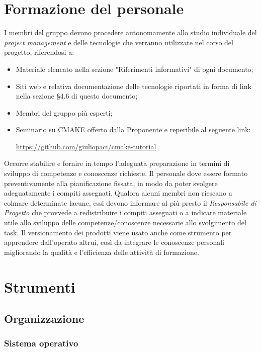 \documentclass[../NormediProgetto.tex]{subfiles}
\begin{document}
	\section{Formazione del personale}
	I membri del gruppo devono procedere autonomamente allo studio individuale del \textit{project management} e delle tecnologie che verranno utilizzate nel corso del progetto, riferendosi a:
	\begin{itemize}
		\item Materiale elencato nella sezione "Riferimenti informativi" di ogni documento;
		\item Siti web e relativa documentazione delle tecnologie riportati in forma di link nella sezione §4.6 di questo documento;
		\item Membri del gruppo più esperti;
		\item Seminario su CMAKE offerto dalla Proponente e reperibile al seguente link:
		\begin{center}
			\url{https://github.com/giuliopaci/cmake-tutorial}
		\end{center} 
	\end{itemize}
	Occorre stabilire e fornire in tempo l'adeguata preparazione in termini di sviluppo di competenze e conoscenze richieste. Il personale dove essere formato preventivamente alla pianificazione fissata, in modo da poter svolgere adeguatamente i compiti
	assegnati. Qualora alcuni membri non riescano a colmare determinate lacune, essi devono informare al più presto il \textit{Responsabile di Progetto} che provvede a redistribuire i compiti assegnati o a indicare materiale utile allo sviluppo delle competenze/conoscenze necessarie allo svolgimento del task.
	Il versionamento dei prodotti viene usato anche come strumento per apprendere dall'operato altrui, così da integrare le conoscenze personali migliorando la qualità e l'efficienza delle attività di formazione.
	
	\section{Strumenti}
	
	\subsection{Organizzazione}
	
	\subsubsection{Sistema operativo}
	
\end{document}
